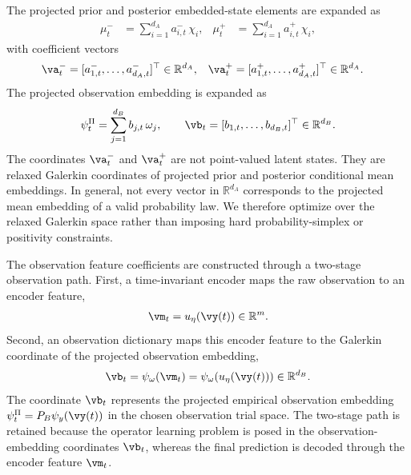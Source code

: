 \documentclass[twoside,11pt]{article}
\begin{document}
The projected prior and posterior embedded-state elements are expanded
as
\begin{align}
\mu_t^-
&=
\sum_{i=1}^{d_A}
a_{i,t}^-\,\chi_i,
&
\mu_t^+
&=
\sum_{i=1}^{d_A}
a_{i,t}^+\,\chi_i,
\label{eq:prior_posterior_galerkin_expansion}
\end{align}
with coefficient vectors
\begin{align}
\va_t^-
&=
[a_{1,t}^-,\dots,a_{d_A,t}^-]^\top
\in\mathbb R^{d_A},
&
\va_t^+
&=
[a_{1,t}^+,\dots,a_{d_A,t}^+]^\top
\in\mathbb R^{d_A}.
\label{eq:prior_posterior_coefficient_vectors}
\end{align}
The projected observation embedding is expanded as
\begin{align}
\psi_t^\Pi
=
\sum_{j=1}^{d_B}
b_{j,t}\,\omega_j,
\qquad
\vb_t
=
[b_{1,t},\dots,b_{d_B,t}]^\top
\in\mathbb R^{d_B}.
\label{eq:observation_galerkin_expansion_revised}
\end{align}
The coordinates $\va_t^-$ and $\va_t^+$ are not point-valued latent
states. They are relaxed Galerkin coordinates of projected prior and
posterior conditional mean embeddings. In general, not every vector in
$\mathbb R^{d_A}$ corresponds to the projected mean embedding of a
valid probability law. We therefore optimize over the relaxed Galerkin
space rather than imposing hard probability-simplex or positivity
constraints.

The observation feature coefficients are constructed through a
two-stage observation path. First, a time-invariant encoder maps the raw
observation to an encoder feature,
\begin{align}
\vm_t
=
u_\eta(\vy(t))
\in\mathbb R^m.
\label{eq:encoder_feature_revised}
\end{align}
Second, an observation dictionary maps this encoder feature to the
Galerkin coordinate of the projected observation embedding,
\begin{align}
\vb_t
=
\psi_\omega(\vm_t)
=
\psi_\omega(u_\eta(\vy(t)))
\in\mathbb R^{d_B}.
\label{eq:observation_dictionary_revised}
\end{align}
The coordinate $\vb_t$ represents the projected empirical observation
embedding $\psi_t^\Pi=P_B\psi_y(\vy(t))$ in the chosen observation
trial space. The two-stage path is retained because the operator
learning problem is posed in the observation-embedding coordinates
$\vb_t$, whereas the final prediction is decoded through the encoder
feature $\vm_t$.
\end{document}
